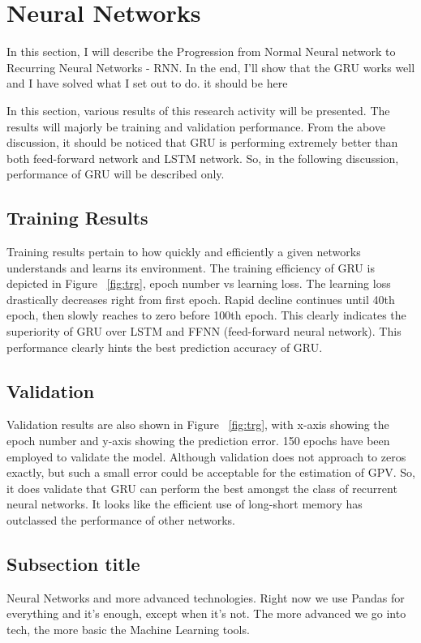 \section{Neural Networks}

In this section, I will describe the Progression from Normal Neural network to Recurring Neural Networks - RNN. In the end, I'll show that the GRU works well and I have solved what I set out to do. 
it should be here


In this section, various results of this research activity will be presented. The results will majorly be training and validation performance. From the above discussion, it should be noticed that GRU is performing extremely better than both feed-forward network and LSTM network. So, in the following discussion, performance of GRU will be described only.  

\subsection{Training Results}

Training results pertain to how quickly and efficiently a given networks understands and learns its environment. The training efficiency of GRU is depicted in Figure ~\ref{fig:trg}, epoch number vs learning loss. The learning loss drastically decreases right from first epoch. Rapid decline continues until 40th epoch, then slowly reaches to zero before 100th epoch. This clearly indicates the superiority of GRU over LSTM and FFNN (feed-forward neural network). This performance clearly hints the best prediction accuracy of GRU.  



\subsection{Validation}

Validation results are also shown in Figure ~\ref{fig:trg}, with x-axis showing the epoch number and y-axis showing the prediction error. 150 epochs have been employed to validate the model. Although validation does not approach to zeros exactly, but such a small error could be acceptable for the estimation of GPV. So, it does validate that GRU can perform the best amongst the class of recurrent neural networks. It looks like the efficient use of long-short memory has outclassed the performance of other networks. 


\subsection{Subsection title}
Neural Networks and more advanced technologies. Right now we use Pandas for everything and it's enough, except when it's not. The more advanced we go into tech, the more basic the Machine Learning tools.

